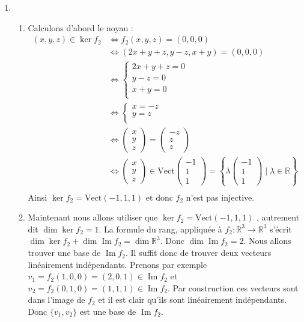 \documentclass[11pt,a4paper]{article}
\newcommand{\Rr}{\mathbb{R}} \newcommand{\R}{\mathbb{R}}
\renewcommand{\Im}{\mathop{\mathrm{Im}}\nolimits}
\begin{document}
\begin{enumerate}
  \item 
\begin{enumerate}
  \item Calculons d'abord le noyau :
\begin{align*}
(x,y,z) \in \ker f_2
  & \iff f_2(x,y,z) = (0,0,0) \\
  & \iff (2x+y+z,y-z,x+y) = (0,0,0) \\
  &\iff \begin{cases}
         2x+y+z = 0 \\
         y-z = 0 \\   
         x+y = 0 \\ 
        \end{cases} \\
  & \iff  \begin{cases}
         x = -z \\
         y = z \\   
        \end{cases} \\
  & \iff 
  \begin{pmatrix}x\\y\\z\end{pmatrix} = \begin{pmatrix}-z\\z\\z\end{pmatrix}\\ 
  &\iff 
  \begin{pmatrix}x\\y\\z\end{pmatrix} \in 
  \text{Vect} \begin{pmatrix}-1\\1\\1\end{pmatrix} 
  = \left\lbrace \lambda\begin{pmatrix}-1\\1\\1\end{pmatrix} \mid \lambda \in \Rr \right\rbrace\\ 
\end{align*}
Ainsi $\ker f_2 =  \text{Vect}(-1,1,1) $ et donc $f_2$ n'est pas injective.

  \item Maintenant nous allons utiliser que $\ker f_2 = \text{Vect}(-1,1,1)$ , autrement dit
$\dim  \ker f_2 = 1$.
La formule du rang, appliquée à $f_2 : \Rr^3 \to \Rr^3$ s'écrit 
$\dim \ker f_2 + \dim \Im f_2 = \dim \Rr^3$. Donc $\dim \Im f_2 = 2$.
Nous allons trouver une base de $\Im f_2$. Il suffit donc de trouver deux vecteurs linéairement indépendants.
Prenons par exemple
$v_1 = f_2(1,0,0) =  (2,0,1) \in\Im f_2$
et $v_2 = f_2(0,1,0) = (1,1,1) \in \Im f_2$. Par construction ces vecteurs sont dans l'image de $f_2$ et 
il est clair qu'ils sont linéairement indépendants. Donc $\{v_1,v_2\}$ est une base de $\Im f_2$.


\end{enumerate}
\end{enumerate}
\end{document}
